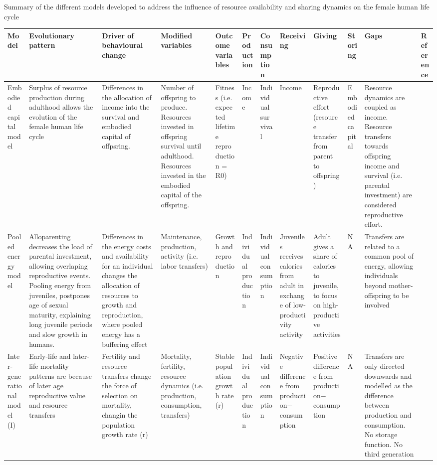 \documentclass{article}
\begin{document}
\begin{landscape}
    \centering
    \caption{Summary of the different models developed to address the influence of resource availability and sharing dynamics on the female human life cycle}
    \begin{longtable}{ p{} p{} p{} p{} p{} p{} p{} p{} p{} p{} p{} p{} }
    \hline
    Model & Evolutionary pattern & Driver of behavioural change & Modified variables & Outcome variables & Production & Consumption & Receiving & Giving & Storing & Gaps & Reference \\ 
    \hline
    Embodied capital model & Surplus of resource production during adulthood allows the evolution of the female human life cycle & Differences in the allocation of income into the survival and embodied capital of offpsring. & Number of offspring to produce. Resources invested in offspring survival until adulthood. Resources invested in the embodied capital of the offspring. & Fitness (i.e. expected lifetime reproduction = R0) & Income & Individual survival & Income & Reproductive effort (resource transfer from parent to offspring) & Embodied capital & Resource dynamics are coupled as income. Resource transfers towards offspring income and survival (i.e. parental investment) are considered reproductive effort. & \cite{kaplan1996theory,kaplan2000theory,kaplan2003embodied} \\ 
    Pooled energy model & Alloparenting decreases the load of parental investment, allowing overlaping reproductive events. Pooling energy from juveniles, postpones age of sexual maturity, explaining long juvenile periods and slow growth in humans. & Differences in the energy costs and availability for an individual changes the allocation of resources to growth and reproduction, where pooled energy has a buffering effect & Maintenance, production, activity (i.e. labor transfers) & Growth and reproduction & Individual production & Individual consumption & Juveniles receives calories from adult in exchange of low-productivity activity & Adult gives a share of calories to juvenile, to focus on high-productive activities & NA & Transfers are related to a common pool of energy, allowing individuals beyond mother-offspring to be involved & \cite{kramer2010pooled} \\  
    Inter-generational model (I) & Early-life and later-life mortality patterns are because of later age reproductive value and resource transfers & Fertility and resource transfers change the force of selection on mortality, changin the population growth rate (r) & Mortality, fertility, resource dynamics (i.e. production, consumption, transfers) & Stable population growth rate (r) & Individual production & Individual consumption & Negative difference from production$-$consumption & Positive difference from production$-$consumption & NA & Transfers are only directed downwards and modelled as the difference between production and consumption. No storage function. No third generation & \cite{lee2002children,lee2003rethinking,lee2008sociality} \\  

\end{longtable}
\end{landscape}
\end{document}
